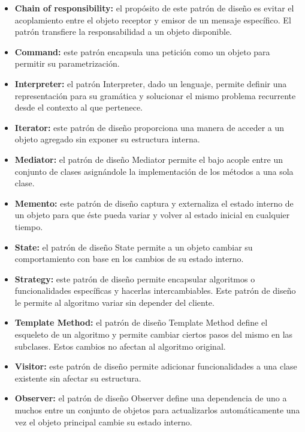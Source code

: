 \documentclass[twoside,twocolumn]{article}
\begin{document}
\begin{itemize}
	\begin{itemize}
		\item \textbf{Chain of responsibility:}	el propósito de este patrón de diseño es evitar el acoplamiento entre el objeto receptor y emisor de un mensaje específico. El patrón transfiere la responsabilidad a un objeto disponible.  
		\item \textbf{Command:} este patrón encapsula una petición como un objeto para permitir su parametrización.   
		\item \textbf{Interpreter:} el patrón Interpreter, dado un lenguaje, permite definir una representación para su gramática y solucionar el mismo problema recurrente desde el contexto al que pertenece.  
		\item \textbf{Iterator:}	este patrón de diseño proporciona una manera de acceder a un objeto agregado sin exponer su estructura interna.  
		\item \textbf{Mediator:}  el patrón de diseño Mediator permite el bajo acople entre un conjunto de clases asignándole la implementación de los métodos a una sola clase.   
		\item \textbf{Memento:} este patrón de diseño captura y externaliza el estado interno de un objeto para que éste pueda variar y volver al estado inicial en cualquier tiempo.   
		\item \textbf{State:} el patrón de diseño State permite a un objeto cambiar su comportamiento con base en los cambios de su estado interno.  
        \item \textbf{Strategy:} este patrón de diseño permite encapsular algoritmos o funcionalidades específicas y hacerlas intercambiables. Este patrón de diseño le permite al algoritmo variar sin depender del cliente.  
        \item \textbf{Template Method:} el patrón de diseño Template Method define el esqueleto de un algoritmo y permite cambiar ciertos pasos del mismo en las subclases. Estos cambios no afectan al algoritmo original.  
        \item \textbf{Visitor:} este patrón de diseño permite adicionar funcionalidades a una clase existente sin afectar su estructura. 
        \item \textbf{Observer:} el patrón de diseño Observer define una dependencia de uno a muchos entre un conjunto de objetos para actualizarlos automáticamente una vez el objeto principal cambie su estado interno. 
        \\
        \\
    \end{itemize}



\end{itemize}
\end{document}
